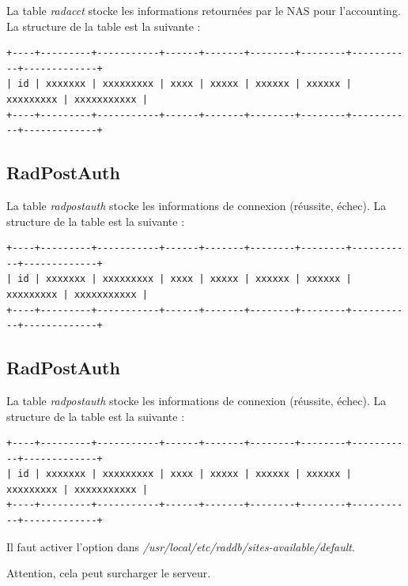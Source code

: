 La table \textit{radacct} stocke les informations retournées par le NAS pour l'accounting. La structure de la table est la suivante :

\begin{verbatim}
+----+---------+-----------+------+-------+--------+--------+-----------+-------------+
| id | xxxxxxx | xxxxxxxxx | xxxx | xxxxx | xxxxxx | xxxxxx | xxxxxxxxx | xxxxxxxxxxx |
+----+---------+-----------+------+-------+--------+--------+-----------+-------------+
\end{verbatim}

\subsection{RadPostAuth}

La table \textit{radpostauth} stocke les informations de connexion (réussite, échec). La structure de la table est la suivante :

\begin{verbatim}
+----+---------+-----------+------+-------+--------+--------+-----------+-------------+
| id | xxxxxxx | xxxxxxxxx | xxxx | xxxxx | xxxxxx | xxxxxx | xxxxxxxxx | xxxxxxxxxxx |
+----+---------+-----------+------+-------+--------+--------+-----------+-------------+
\end{verbatim}

\subsection{RadPostAuth}

La table \textit{radpostauth} stocke les informations de connexion (réussite, échec). La structure de la table est la suivante :

\begin{verbatim}
+----+---------+-----------+------+-------+--------+--------+-----------+-------------+
| id | xxxxxxx | xxxxxxxxx | xxxx | xxxxx | xxxxxx | xxxxxx | xxxxxxxxx | xxxxxxxxxxx |
+----+---------+-----------+------+-------+--------+--------+-----------+-------------+
\end{verbatim}

Il faut activer l'option dans \textit{/usr/local/etc/raddb/sites-available/default}.

Attention, cela peut surcharger le serveur.

